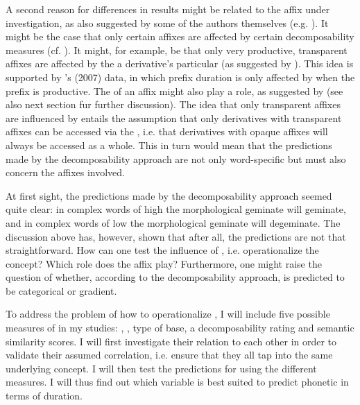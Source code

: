 A second reason for differences in results might be related to the affix under investigation, as also suggested by some of the authors themselves (e.g. \citealt{Hanique.2011,Schuppler.2012}). It might be the case that only certain affixes are affected by certain decomposability measures (cf. \citealt{Collie.2008,Hanique.2011,Schuppler.2012}). It might, for example, be that only very productive, transparent affixes are affected by the a derivative's particular  (as suggested by \citealt{Hanique.2011}). This idea is supported by \citeauthor{Hay.2007}'s (2007) data, in which prefix duration is only affected by  when the prefix is productive. The  of an affix might also play a role, as suggested by \cite{Schuppler.2012} (see also next section fur further discussion). 
The idea that only transparent affixes are influenced by  entails the assumption that only derivatives with transparent affixes can be accessed via the ,  i.e. that derivatives with opaque affixes will always be accessed as a whole. This in turn would mean that the predictions made by the decomposability approach are not only word-specific but must also concern the affixes involved.



At first sight, the predictions made by the decomposability approach seemed quite clear: in complex words of high  the morphological geminate will geminate, and in complex words of low  the morphological geminate will degeminate. The discussion above has, however, shown that after all, the predictions are not that straightforward.
 How can one test the influence of , i.e. operationalize the concept? Which role does the affix play? Furthermore, one might raise the question of whether, according to the decomposability approach,  is predicted to be categorical or gradient. 




 To address the problem of how to operationalize , I will include five possible measures of  in my studies: , , type of base, a decomposability rating and semantic similarity scores. I will first investigate their relation to each other in order to validate their assumed correlation, i.e. ensure that they all tap into the same underlying concept. I will then test the predictions for  using the different measures. I will thus find out which variable is best suited to predict phonetic  in terms of duration.




